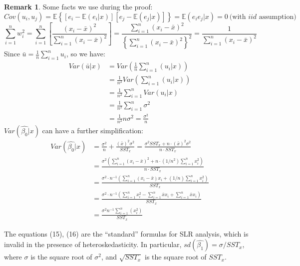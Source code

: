 \documentclass[a4paper, 10pt]{article}
\theoremstyle{definition}	%
\newtheorem*{remark}{Remark}
\begin{document}
\begin{remark}
    Some facts we use during the proof:
    \begin{equation*}
        Cov(u_i, u_j) = \mathbb{E} \left\{ \left[e_i - \mathbb{E}(e_i|x)\right] \left[e_j - \mathbb{E}(e_j|x)\right]\right\} = \mathbb{E}(e_i e_j|x) = 0\  \text{(with $iid$ assumption)}
    \end{equation*}
    \begin{equation*}
        \sum_{i=1}^{n}w_i^2 = \sum_{i=1}^{n} \left[ \frac{(x_i - \bar{x})^2}{\sum_{i=1}^{n} \left(x_i - \bar{x}\right)^2}\right] = \frac{\sum_{i=1}^{n} \left(x_i - \bar{x}\right)^2}{\left\{\sum_{i=1}^{n} \left(x_i - \bar{x}\right)^2 \right\}^2} = 
        \frac{1}{\sum_{i=1}^{n} \left(x_i - \bar{x}\right)^2}
    \end{equation*}
    Since $\bar{u} = \frac{1}{n} \sum_{i=1}^{n}u_i$, so we have:
    \begin{align*}
         Var(\bar{u}|x) &= Var\left(\frac{1}{n} \sum_{i=1}^{n}(u_i|x)\right)\\ 
         &= \frac{1}{n^2}Var\left(\sum_{i=1}^{n}(u_i|x)\right)\\
         &= \frac{1}{n^2}\sum_{i=1}^{n}Var(u_i|x)\\
         &= \frac{1}{n^2}\sum_{i=1}^{n} \sigma^2\\
         &= \frac{1}{n^2} n\sigma^2 = \frac{\sigma^2}{n}
    \end{align*}
    $ Var(\hat{\beta_0}|x)$ can have a further simplification:
    \begin{align*}
        Var(\hat{\beta_0}|x) &= \frac{\sigma^2}{n} + \frac{(\bar{x})^2 \sigma^2}{SST_x} = 
        \frac{\sigma^2 SST_x + n \cdot (\bar{x})^2 \sigma^2}{n \cdot SST_x}\\
        &= \frac{\sigma^2\left(\sum_{i=1}^{n} \left(x_i - \bar{x}\right)^2 + n \cdot (1/n^2)\sum_{i=1}^{n}x_i^2 \right)}{n \cdot SST_x}\\
        &= \frac{\sigma^2 \cdot n^{-1} \left(\sum_{i=1}^{n} \left(x_i - \bar{x}\right)x_i +  (1/n)\sum_{i=1}^{n}x_i^2 \right)}{SST_x}\\
        &= \frac{\sigma^2 \cdot n^{-1} \left(\sum_{i=1}^{n}x_i^2 - \sum_{i=1}^{n}\bar{x}x_i +  \sum_{i=1}^{n}\bar{x}x_i \right)}{SST_x}\\
        &= \frac{\sigma^2 n^{-1} \sum_{i=1}^{n} \left(x_i^2\right)}{SST_x}
    \end{align*}
\end{remark}
The equations (15), (16) are the ``standard'' formulas for SLR analysis, which is invalid in the presence of heteroskedasticity. In particular, $sd(\hat{\beta_1}) = \sigma/SST_x$, where $\sigma$ is the square root of $\sigma^2$, and $\sqrt{SST_x}$ is the square root of $SST_x$.
\end{document}
